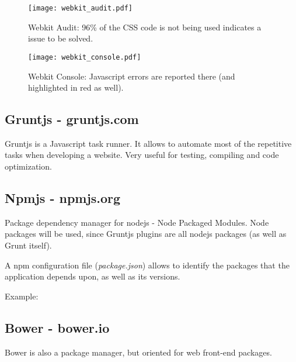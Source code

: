     \begin{figure}
      \begin{center}
        \texttt{[image: webkit\_audit.pdf]}
      \end{center}
      \caption{Webkit Audit: 96\% of the CSS code is not being used indicates a issue to be solved.}
      \label{fig:webkit_audit}
    \end{figure}

    \begin{figure}
      \begin{center}
        \texttt{[image: webkit\_console.pdf]}
      \end{center}
      \caption{Webkit Console: Javascript errors are reported there (and highlighted in red as well).}
      \label{fig:webkit_console}
    \end{figure}

  \subsection{Gruntjs - gruntjs.com} %
    \label{sub:gruntjs}
      Gruntjs is a Javascript task runner.
      It allows to automate most of the repetitive tasks when developing a website.
      Very useful for testing, compiling and code optimization.

  \subsection{Npmjs - npmjs.org} %
  \label{sub:npm}
    Package dependency manager for nodejs - Node Packaged Modules.
    Node packages will be used, since Gruntjs plugins are all nodejs packages (as well as Grunt itself).

    A npm configuration file (\emph{package.json}) allows to identify the packages that the application depends upon, as well as its versions.

    Example: 

    

  \subsection{Bower - bower.io} %
  \label{sub:bower}
  
  Bower is also a package manager, but oriented for web front-end packages.


